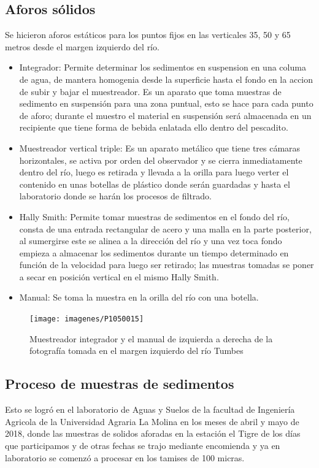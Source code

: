 \documentclass[12pt,a4paper]{report}
\begin{document}
\subsection{Aforos sólidos}
Se hicieron aforos estáticos para los puntos fijos en las verticales 35, 50 y 65 metros desde el margen izquierdo del río.

\begin{itemize}
\item Integrador: Permite determinar los sedimentos en suspension en una columa de agua, de mantera homogenia desde la superficie hasta el fondo en la accion de subir y bajar el muestreador. Es un aparato que toma muestras de sedimento en suspensión para una zona puntual, esto se hace para cada punto de aforo; durante el muestro el material en suspensión será almacenada en un recipiente que tiene forma de bebida enlatada ello dentro del pescadito.
\item Muestreador vertical triple: Es un aparato metálico que tiene tres cámaras horizontales, se activa por orden del observador y se cierra inmediatamente dentro del río, luego es retirada y llevada a la orilla para luego verter el contenido en unas botellas de plástico donde serán guardadas y hasta el laboratorio donde se harán los procesos de filtrado.
\item Hally Smith: Permite tomar muestras de sedimentos en el fondo del río, consta de una entrada rectangular de acero y una malla en la parte posterior, al sumergirse este se alinea a la dirección del río y una vez toca fondo empieza a almacenar los sedimentos durante un tiempo determinado en función de la velocidad  para luego ser retirado; las muestras tomadas se poner a secar en posición vertical en el mismo Hally Smith.
\item Manual: Se toma la muestra en la orilla del río con una botella.

\end{itemize}


\begin{figure}[h]
  \centering
    \texttt{[image: imagenes/P1050015]}
  \caption{Muestreador integrador y el manual de izquierda a derecha de la fotografía tomada en el margen izquierdo del río Tumbes}
  \label{fig:IntegradorPescesitoYManual}
\end{figure}




\subsection{Proceso de muestras de sedimentos}
Esto se logró en el laboratorio de Aguas y Suelos de la facultad de Ingeniería Agricola de la Universidad Agraria La Molina en los meses de abril y mayo de 2018, donde las muestras de solidos aforadas en la estación el Tigre de los días que participamos y de otras fechas se trajo mediante encomienda y ya en laboratorio se comenzó a procesar en los tamises de 100 micras.
\end{document}
